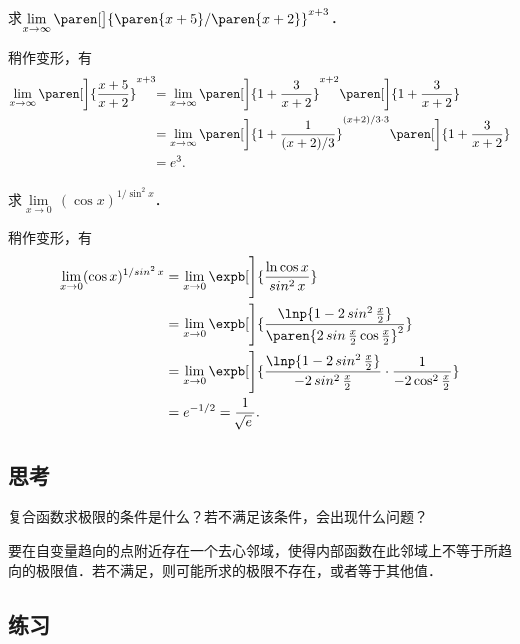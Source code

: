 \begin{example*}
  求\(\lim\limits_{x\to\infty} \paren[\big]{\paren{x+5}/\paren{x+2}}^{x+3}\)．

  \begin{remark}
    稍作变形，有
    \begin{align*}
      \lim_{x\to\infty} \paren[\bigg]{\frac{x+5}{x+2}}^{x+3}\negthickspace
      &= \lim_{x\to\infty} \paren[\bigg]{1 + \frac{3}{x+2}}^{x+2} \paren[\bigg]{%
        1 + \frac{3}{x+2}} \\
      &= \lim_{x\to\infty} \paren[\bigg]{1 + \frac{1}{(x+2)/3}}^{(x+2)/3\cdot3} \paren[\bigg]{%
        1 + \frac{3}{x+2}} \\
      &= e^3.
    \end{align*}
  \end{remark}
\end{example*}

\begin{example*}
  求\(\lim\limits_{x\to0} \,(\cos x)^{1/\!\sin^2 x}\)．

  \begin{remark}
    稍作变形，有
    \begin{align*}
      \lim_{x\to0} (\cos x)^{1/\!\sin^2 x}
      &= \lim_{x\to0} \expb[\Bigg]{\frac{\ln \cos x}{\sin^2 x}} \\
      &= \lim_{x\to0} \expb[\Bigg]{
        \frac{\lnp{1 - 2 \sin^2 \frac x2}}{
        \paren{2 \sin\frac x2 \cos\frac x2}^2}} \\
      &= \lim_{x\to0} \expb[\Bigg]{
        \frac{\lnp{1 - 2 \sin^2 \frac x2}}{-2 \sin^2 \frac x2}
        \cdot \frac{1}{-2 \cos^2 \frac x2}} \\
      &= e^{-1/2} = \frac1{\!\sqrt e\,}.
    \end{align*}
  \end{remark}
\end{example*}

\subsection*{思考}

复合函数求极限的条件是什么？若不满足该条件，会出现什么问题？

\ifshowsolp
  \pskip
  要在自变量趋向的点附近存在一个去心邻域，使得内部函数在此邻域上不等于所趋向的极限值．若不满足，则可能所求的极限不存在，或者等于其他值．
\fi

\ifshowex
{}
\subsection*{练习}

